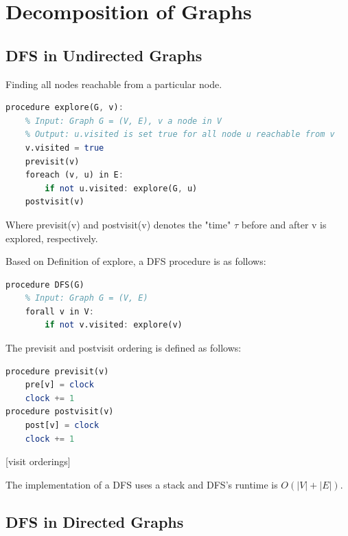 \section{Decomposition of Graphs}

\subsection{DFS in Undirected Graphs}

\begin{definition}[explore]
Finding all nodes reachable from a particular node.
	\begin{lstlisting}[mathescape=true, language=Octave]
procedure explore(G, v):
	% Input: Graph G = (V, E), v a node in V
	% Output: u.visited is set true for all node u reachable from v
	v.visited = true
	previsit(v)
	foreach (v, u) in E:
		if not u.visited: explore(G, u)
	postvisit(v)
\end{lstlisting}
Where previsit(v) and postvisit(v) denotes the "time" $\tau$ before and after v is explored, respectively.
\end{definition}

\begin{definition}[DFS]
Based on Definition of explore, a DFS procedure is as follows:
\begin{lstlisting}[mathescape=true, language=Octave]
procedure DFS(G)
	% Input: Graph G = (V, E)
	forall v in V:
		if not v.visited: explore(v)
\end{lstlisting}
\end{definition}

\begin{definition}[ordering]
The previsit and postvisit ordering is defined as follows:
\begin{lstlisting}[mathescape=true, language=Octave]
procedure previsit(v)
	pre[v] = clock
	clock += 1
procedure postvisit(v)
	post[v] = clock
	clock += 1
\end{lstlisting}
\end{definition}[visit orderings]

\begin{remark}
The implementation of a DFS uses a stack and DFS's runtime is $O(|V|+|E|)$.
\end{remark}

\subsection{DFS in Directed Graphs}

